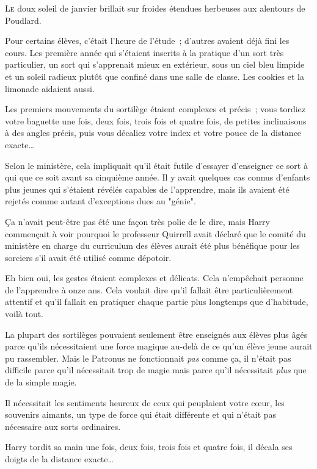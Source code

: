 
\lettrine{L}{e} doux soleil de janvier brillait sur froides étendues herbeuses aux alentours de Poudlard.

Pour certains élèves, c'était l'heure de l'étude~; d'autres avaient déjà fini les cours. Les première année qui s'étaient inscrits à la pratique d'un sort très particulier, un sort qui s'apprenait mieux en extérieur, sous un ciel bleu limpide et un soleil radieux plutôt que confiné dans une salle de classe. Les cookies et la limonade aidaient aussi.

Les premiers mouvements du sortilège étaient complexes et précis~; vous tordiez votre baguette une fois, deux fois, trois fois et quatre fois, de petites inclinaisons à des angles précis, puis vous décaliez votre index et votre pouce de la distance exacte…

Selon le ministère, cela impliquait qu'il était futile d'essayer d'enseigner ce sort à qui que ce soit avant sa cinquième année. Il y avait quelques cas connus d'enfants plus jeunes qui s'étaient révélés capables de l'apprendre, mais ils avaient été rejetés comme autant d'exceptions dues au "génie".

Ça n'avait peut-être pas été une façon très polie de le dire, mais Harry commençait à voir pourquoi le professeur Quirrell avait déclaré que le comité du ministère en charge du curriculum des élèves aurait été plus bénéfique pour les sorciers s'il avait été utilisé comme dépotoir.

Eh bien oui, les gestes étaient complexes et délicats. Cela n'empêchait personne de l'apprendre à onze ans. Cela voulait dire qu'il fallait être particulièrement attentif et qu'il fallait en pratiquer chaque partie plus longtemps que d'habitude, voilà tout.

La plupart des sortilèges pouvaient seulement être enseignés aux élèves plus âgés parce qu'ils nécessitaient une force magique au-delà de ce qu'un élève jeune aurait pu rassembler. Mais le Patronus ne fonctionnait \emph{pas} comme ça, il n'était pas difficile parce qu'il nécessitait trop de magie mais parce qu'il nécessitait \emph{plus} que de la simple magie.

Il nécessitait les sentiments heureux de ceux qui peuplaient votre cœur, les souvenirs aimants, un type de force qui était différente et qui n'était pas nécessaire aux sorts ordinaires.

Harry tordit sa main une fois, deux fois, trois fois et quatre fois, il décala ses doigts de la distance exacte…

